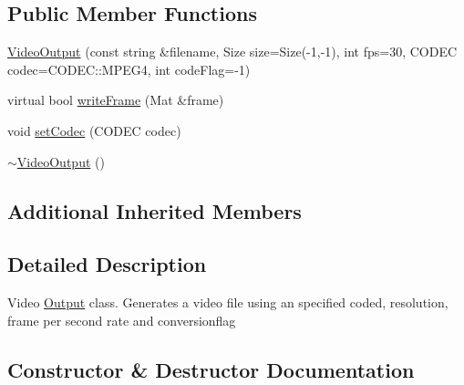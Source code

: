 \subsection*{Public Member Functions}
\begin{DoxyCompactItemize}
\item 
\hyperlink{classviva_1_1_video_output_af696901783add61a8855e325d214db88}{Video\+Output} (const string \&filename, Size size=Size(-\/1,-\/1), int fps=30, C\+O\+D\+EC codec=C\+O\+D\+E\+C\+::\+M\+P\+E\+G4, int code\+Flag=-\/1)
\item 
virtual bool \hyperlink{classviva_1_1_video_output_ae18c0d361f077619db8d3cdab8283697}{write\+Frame} (Mat \&frame)
\item 
void \hyperlink{classviva_1_1_video_output_a261b56ddf7128f672adf880f6788798e}{set\+Codec} (C\+O\+D\+EC codec)
\item 
\hyperlink{classviva_1_1_video_output_af8cd62606fabbf14b33f1625cf1d2cb6}{$\sim$\+Video\+Output} ()
\end{DoxyCompactItemize}
\subsection*{Additional Inherited Members}


\subsection{Detailed Description}
Video \hyperlink{classviva_1_1_output}{Output} class. Generates a video file using an specified coded, resolution, frame per second rate and conversionflag 

\subsection{Constructor \& Destructor Documentation}

